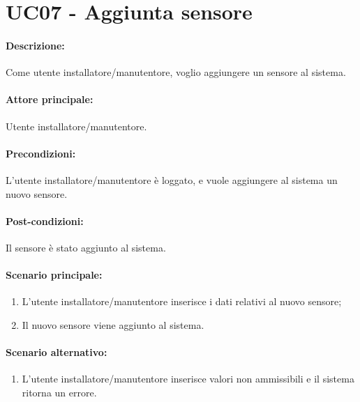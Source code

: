 \section{UC07 - Aggiunta sensore}

\paragraph{Descrizione:}
Come utente installatore/manutentore, voglio aggiungere un sensore al sistema.

\paragraph{Attore principale:}
Utente installatore/manutentore.

\paragraph{Precondizioni:}
L'utente installatore/manutentore è loggato, e vuole aggiungere al sistema un nuovo sensore.

\paragraph{Post-condizioni:}
Il sensore è stato aggiunto al sistema.

\paragraph{Scenario principale:}
\begin{enumerate}
    \item L'utente installatore/manutentore inserisce i dati relativi al nuovo sensore;
    \item Il nuovo sensore viene aggiunto al sistema.
\end{enumerate}

\paragraph{Scenario alternativo:}
\begin{enumerate}
    \item L'utente installatore/manutentore inserisce valori non ammissibili e il sistema ritorna un errore.
\end{enumerate}
